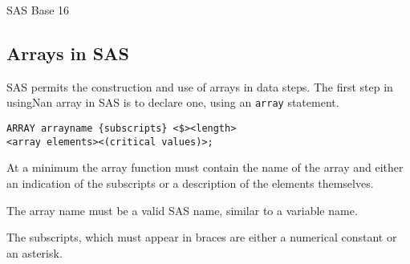 
SAS Base 16

\subsection*{Arrays in SAS}
SAS permits the construction and use of arrays in data steps. The first step in usingNan array in SAS is to declare one, using an \texttt{array} statement.

\begin{framed}
\begin{verbatim}
ARRAY arrayname {subscripts} <$><length>
<array elements><(critical values)>;
\end{verbatim}
\end{framed}

At a minimum the array function must contain the name of the array
and either an indication of the subscripts or a description of the
elements themselves.

The array name must be a valid SAS name, similar to a variable name.

The subscripts, which must appear in braces are either a numerical constant or an asterisk.
